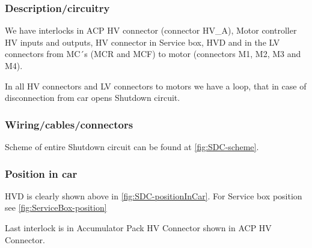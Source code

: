 \subsubsection{Description/circuitry}
\iffalse Describe the concept and circuitry of the Shutdown System Interlocks.
Note: Interlocks are circuits used to open the shutdown circuit if a connector is disconnected or enclosure is opened.  This is not the entire shutdown circuit.\fi

We have interlocks in ACP HV connector (connector HV\_A), Motor controller HV inputs and outputs, HV connector in Service box, HVD and in the LV connectors from MC´s (MCR and MCF) to motor (connectors M1, M2, M3 and M4). 

In all HV connectors and LV connectors to motors we have a loop, that in case of disconnection from car opens Shutdown circuit.

\subsubsection{Wiring/cables/connectors}

Scheme of entire Shutdown circuit can be found at \ref{fig:SDC-scheme}.

\subsubsection{Position in car}
HVD is clearly shown above in \ref{fig:SDC-positionInCar}. For Service box position see \ref{fig:ServiceBox-position}

Last interlock is in Accumulator Pack HV Connector shown in ACP HV Connector.